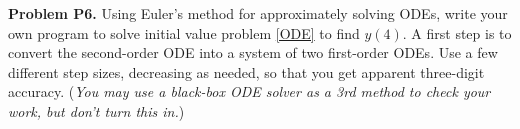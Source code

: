 \documentclass[12pt]{amsart}
\newcommand{\prob}[1]{\bigskip\noindent\textbf{#1}\quad }
\begin{document}
\prob{Problem P6.}  Using Euler's method for approximately solving ODEs, write your own program to solve initial value problem \eqref{ODE} to find $y(4)$.  A first step is to convert the second-order ODE into a system of two first-order ODEs.  Use a few different step sizes, decreasing as needed, so that you get apparent three-digit accuracy.  (\emph{You may use a black-box ODE solver as a 3rd method to \emph{check} your work, but don't turn this in.})

\end{document}
